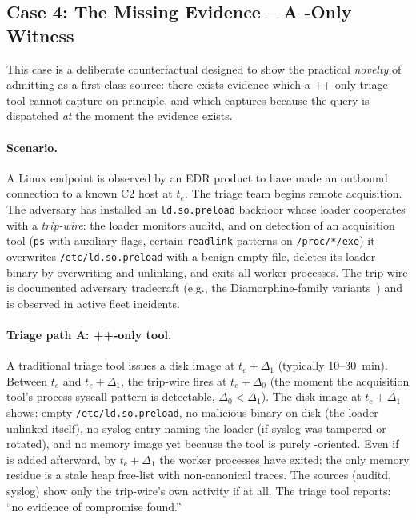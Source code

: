 \subsection{Case 4: The Missing Evidence -- A -Only Witness}
\label{sec:case4}

This case is a deliberate counterfactual designed to show the practical
\emph{novelty} of admitting  as a first-class source: there exists
evidence which a ++-only triage tool cannot capture
on principle, and which  captures because the query is dispatched
\emph{at} the moment the evidence exists.

\paragraph{Scenario.}
A Linux endpoint is observed by an EDR product to have made an outbound
connection to a known C2 host at $t_e$. The triage team begins remote
acquisition. The adversary has installed an \texttt{ld.so.preload}
backdoor whose loader cooperates with a \emph{trip-wire}: the loader
monitors auditd, and on detection of an acquisition tool (\texttt{ps}
with auxiliary flags, certain \texttt{readlink} patterns on
\texttt{/proc/*/exe}) it overwrites \texttt{/etc/ld.so.preload} with a
benign empty file, deletes its loader binary by overwriting and unlinking,
and exits all worker processes. The trip-wire is documented adversary
tradecraft (e.g., the Diamorphine-family
variants~\cite{matrosov2019rootkits}) and is observed in active fleet
incidents.

\paragraph{Triage path A: ++-only tool.}
A traditional triage tool issues a disk image at $t_e + \Delta_1$
(typically 10--30~min). Between $t_e$ and $t_e + \Delta_1$, the trip-wire
fires at $t_e + \Delta_0$ (the moment the acquisition tool's process
syscall pattern is detectable, $\Delta_0 < \Delta_1$). The disk image at
$t_e + \Delta_1$ shows: empty \texttt{/etc/ld.so.preload}, no malicious
binary on disk (the loader unlinked itself), no syslog entry naming the
loader (if syslog was tampered or rotated), and no memory image yet
because the tool is purely -oriented. Even if  is added
afterward, by $t_e + \Delta_1$ the worker processes have exited; the only
memory residue is a stale heap free-list with non-canonical traces. The
 sources (auditd, syslog) show only the trip-wire's own activity
if at all. The triage tool reports: ``no evidence of compromise found.''

